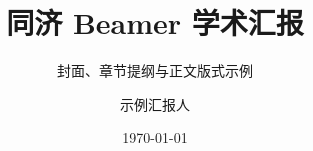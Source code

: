 \title[同济 Beamer 模板示例]{同济 Beamer 学术汇报}
\subtitle{封面、章节提纲与正文版式示例}
\author[示例汇报人]{示例汇报人}
\date{\today}
